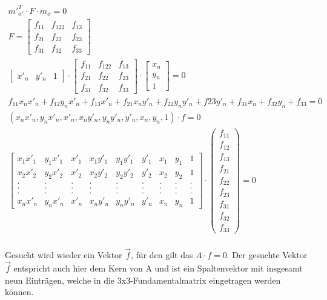 \begin{gather}
	{m'}_{\sigma'}^T \cdot F \cdot m_\sigma =0\\
	F=\begin{bmatrix}
		f_{11}&f_{122}&f_{13}\\
		f_{21}&f_{22}&f_{23}\\
		f_{31}&f_{32}&f_{33}
	\end{bmatrix}\\
	\begin{bmatrix}
		x'_n&y'_n&1
	\end{bmatrix} 
	\cdot
	\begin{bmatrix}
		f_{11}&f_{122}&f_{13}\\
		f_{21}&f_{22}&f_{23}\\
		f_{31}&f_{32}&f_{33}
	\end{bmatrix}
	\cdot
	\begin{bmatrix}
		x_n\\y_n\\1
	\end{bmatrix} =0\\
	f_{11}x_nx'_n+f_{12}y_nx'_n+f_{13}x'_n+f_{21}x_ny'_n+f_{22}y_ny'_n+f{23}y'_n+f_{31}x_n+f_{32}y_n+f_{33} =0\\
	(x_nx'_n,y_nx'_n,x'_n,x_ny'_n,y_ny'_n,y'_n,x_n,y_n,1)\cdot f =0\\
	\begin{bmatrix}
		x_1x'_1&y_1x'_1&x'_1&x_1y'_1&y_1y'_1&y'_1&x_1&y_1&1\\
		x_2x'_2&y_2x'_2&x'_2&x_2y'_2&y_2y'_2&y'_2&x_2&y_2&1\\
		.&.&.&.&.&.&.&.&.\\
		.&.&.&.&.&.&.&.&.\\
		.&.&.&.&.&.&.&.&.\\
		x_nx'_n&y_nx'_n&x'_n&x_ny'_n&y_ny'_n&y'_n&x_n&y_n&1
	\end{bmatrix}
	\cdot 
	\begin{pmatrix}
		f_{11}\\f_{12}\\f_{13}\\f_{21}\\f_{22}\\f_{23}\\f_{31}\\f_{32}\\f_{33}
	\end{pmatrix}
	= 0
\end{gather}\\

Gesucht wird wieder ein Vektor $\vec{f}$, für den gilt das $A \cdot f = 0$. Der gesuchte Vektor $\vec{f}$ entspricht auch hier dem Kern von A und ist ein Spaltenvektor mit insgesamt neun Einträgen, welche in die 3x3-Fundamentalmatrix eingetragen werden können\cite{HZ,ZZGXr}.\\


